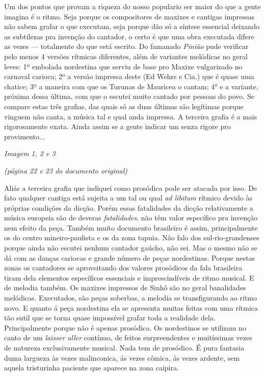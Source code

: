 Um dos pontos que provam a riqueza do nosso populario ser maior do que a
gente imagina é o ritmo. Seja porque os compositores de maxixes e
cantigas impressas não sabem grafar o que executam, seja porque dão só a
síntese essencial deixando as subtilezas pra invenção do cantador, o
certo é que uma obra executada difere as vezes --- totalmente do que
está escrito. Do famanado \emph{Pinião} pude verificar pelo menos 4
versões rítmicas diferentes, além de variantes melódicas no geral leves:
1º embolada nordestina que serviu de base pro Maxixe vulgarizado no
carnaval carioca; 2º a versão impressa deste (Ed Wehrs e Cia.) que é
quase uma chatice; 3º a maneira com que os Turunas de Mauricea o cantam;
4° e a variante, próxima dessa última, com que o escutei muito cantado
por pessoas do povo. Se compare estas três grafias, das quais só as duas
últimas são legítimas porque vinguem não canta, a música tal e qual anda
impressa. A terceira grafia é a mais rigorosamente exata. Ainda assim se
a gente indicar um senza rigore pro provimento...~

\emph{Imagem 1, 2 e 3~}

\emph{(página 22 e 23 do documento original)}

Aliás a terceira grafia que indiquei como prosódica pode ser atacada por
isso. De fato qualquer cantiga está sujeita a um tal ou qual \emph{ad
libitum} rítmico devido às próprias condições da dicção. Porém essas
fatalidades da dicção relativamente a música europeia são de deveras
\emph{fatalidades}, não têm valor específico pra invenção nem efeito da
peça. Também muito documento brasileiro é assim, principalmente os do
centro mineiro-paulista e os da zona tapuia. Não falo dos
sul-rio-grandenses porque ainda não escutei nenhum cantador gaúcho, não
sei. Mas o mesmo não se dá com as danças cariocas e grande número de
peças nordestinas. Porque nestas zonas os cantadores se aproveitando dos
valores prosódicos da fala brasileira tiram dela elementos específicos
essenciais e imprescindíveis de ritmo musical. E de melodia também. Os
maxixes impressos de Sinhô são no geral banalidades melódicas.
Executados, são peças soberbas, a melodia se transfigurando ao ritmo
novo. E quanto á peça nordestina ela se apresenta muitas feitas com uma
rítmica tão sutil que se torna quase impossível grafar toda a realidade
dela. Principalmente porque não é apenas prosódica. Os nordestinos se
utilizam no canto de um \emph{laisser aller} contínuo, de feitos
surpreendentes e muitíssimas vezes de natureza exclusivamente musical.
Nada tem de prosódico. É pura fantasia duma largueza às vezes
malinconica, ás vezes cômica, ás vezes ardente, sem aquela tristurinha
paciente que aparece na zona caipira.

